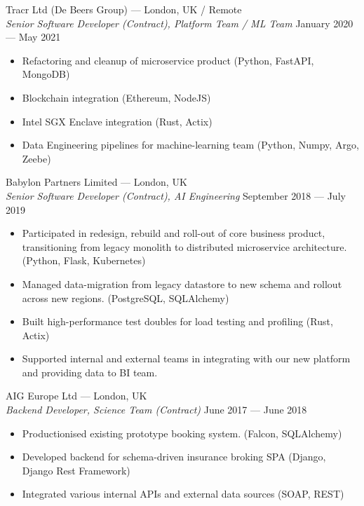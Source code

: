 \documentclass[margin, 10pt]{res}
\begin{document}
\begin{resume}
Tracr Ltd (De Beers Group) --- London, UK / Remote \\
{\sl Senior Software Developer (Contract), Platform Team / ML Team}  \hfill January 2020 --- May 2021 \\
\begin{itemize} \itemsep -1pt
\item Refactoring and cleanup of microservice product (Python, FastAPI, MongoDB)
\item Blockchain integration (Ethereum, NodeJS)
\item Intel SGX Enclave integration (Rust, Actix)
\item Data Engineering pipelines for machine-learning team (Python, Numpy, Argo, Zeebe)
\end{itemize}

Babylon Partners Limited --- London, UK \\
{\sl Senior Software Developer (Contract), AI Engineering}  \hfill September 2018 --- July 2019 \\
\begin{itemize} \itemsep -1pt
\item Participated in redesign, rebuild and roll-out of core business product, transitioning from legacy monolith to distributed microservice architecture. (Python, Flask, Kubernetes)
\item Managed data-migration from legacy datastore to new schema and rollout across new regions. (PostgreSQL, SQLAlchemy)
\item Built high-performance test doubles for load testing and profiling (Rust, Actix)
\item Supported internal and external teams in integrating with our new platform and providing data to BI team.
\end{itemize}

AIG Europe Ltd --- London, UK \\
{\sl Backend Developer, Science Team (Contract)} \hfill June 2017 --- June 2018 \\
\begin{itemize} \itemsep -1pt
\item Productionised existing prototype booking system. (Falcon, SQLAlchemy)
\item Developed backend for schema-driven insurance broking SPA (Django, Django Rest Framework)
\item Integrated various internal APIs and external data sources (SOAP, REST)
\end{itemize}


\end{resume}
\end{document}
